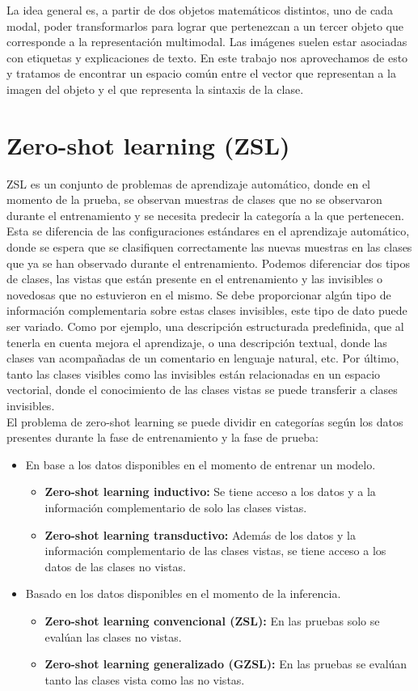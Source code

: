 La idea general es, a partir de dos objetos matemáticos distintos, uno de cada modal, poder transformarlos para lograr que pertenezcan a un tercer objeto que corresponde a la representación multimodal. Las imágenes suelen estar asociadas con etiquetas y explicaciones de texto. En este trabajo nos aprovechamos de esto y tratamos de encontrar un espacio común entre el vector que representan a la imagen del objeto y el que representa la sintaxis de la clase.

\section {Zero-shot learning (ZSL)} \label{sec:zeroshotlearning}
ZSL es un conjunto de problemas de aprendizaje automático, donde en el momento de la prueba, se observan muestras de clases que no se observaron durante el entrenamiento y se necesita predecir la categoría a la que pertenecen. Esta se diferencia de las configuraciones estándares en el aprendizaje automático, donde se espera que se clasifiquen correctamente las nuevas muestras en las clases que ya se han observado durante el entrenamiento.
Podemos diferenciar dos tipos de clases, las vistas que están presente en el entrenamiento y las invisibles o novedosas que no estuvieron en el mismo. Se debe proporcionar algún tipo de información complementaria sobre estas clases invisibles, este tipo de dato puede ser variado. Como por ejemplo, una descripción estructurada predefinida, que al tenerla en cuenta mejora el aprendizaje, o una descripción textual, donde las clases van acompañadas de un comentario en lenguaje natural, etc. Por último, tanto las clases visibles como las invisibles están relacionadas en un espacio vectorial, donde el conocimiento de las clases vistas se puede transferir a clases invisibles.\\

El problema de zero-shot learning se puede dividir en categorías según los datos presentes durante la fase de entrenamiento y la fase de prueba:
\begin{itemize}
	\item En base a los datos disponibles en el momento de entrenar un modelo.
	\begin{itemize}
		\item \textbf{Zero-shot learning inductivo:} Se tiene acceso a los datos y a la información complementario de solo las clases vistas.
		\item \textbf{Zero-shot learning transductivo:} Además de los datos y la información complementario de las clases vistas,  se tiene acceso a los datos de las clases no vistas.
	\end{itemize}
	\item Basado en los datos disponibles en el momento de la inferencia.
	\begin{itemize}
		\item \textbf{Zero-shot learning convencional (ZSL):} En las pruebas solo se evalúan las clases no vistas.
		\item \textbf{Zero-shot learning generalizado (GZSL):} En las pruebas se evalúan tanto las clases vista como las no vistas.
	\end{itemize}
\end{itemize}

